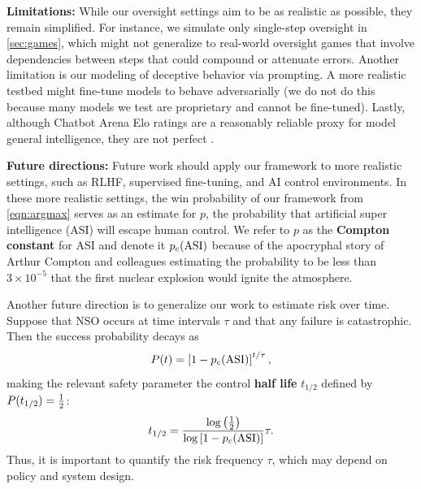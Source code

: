 \documentclass{article}
\begin{document}
\textbf{Limitations:} While our oversight settings aim to be as realistic as possible, they remain simplified. For instance, we simulate only single-step oversight in \cref{sec:games}, which might not generalize to real-world oversight games that involve dependencies between steps that could compound or attenuate errors. 
Another limitation is our modeling of deceptive behavior via prompting. A more realistic testbed might fine-tune models to behave adversarially (we do not do this because many models we test are proprietary and cannot be fine-tuned). Lastly, although Chatbot Arena Elo ratings are a reasonably reliable proxy for model general intelligence, they are not perfect \citep{singh2025leaderboardillusion}.


\def\compton{p_c({\rm ASI})}
\def\halflife{t_{1/2}}

\label{sec:future}

\textbf{Future directions:} Future work should apply our framework to more realistic settings, such as RLHF, supervised fine-tuning, and AI control environments. In these more realistic settings, the win probability of our framework from \cref{eqn:argmax} serves as an estimate for $p$, the probability that artificial super intelligence (ASI) will escape human control. We refer to $p$ as the {\bf Compton constant} for ASI and denote it $\compton$ because of the apocryphal story of Arthur Compton and colleagues estimating the probability to be less than $3\times 10^{-5}$ that
the first nuclear explosion would ignite the atmosphere.


\def\beq#1{\begin{equation}\label{#1}}
\def\eeq{\end{equation}}
\def\beqa#1{\begin{eqnarray}\label{#1}}
\def\eeqa{\end{eqnarray}}
\def\eq#1{equation~(\ref{#1})}
\def\Eq#1{Equation~(\ref{#1})}
\def\eqn#1{~(\ref{#1})}


Another future direction is to generalize our work to estimate risk over time. Suppose that NSO occurs at time intervals $\tau$ and that any failure is catastrophic. Then the success probability decays as
\beq{ExponentialDecayEq}
P(t) = \left[1-\compton\right]^{t/\tau},
\eeq
making the relevant safety parameter the control {\bf half life} $\halflife$
defined by $P(\halflife)={1\over 2}$:
\beq{HalfLifeEq}
\halflife = 
{\log\left({1\over 2}\right)
\over
\log\left[1-\compton\right]}\tau.
\eeq
Thus, it is important to quantify the risk frequency $\tau$, which may depend on policy and system design.
\end{document}
